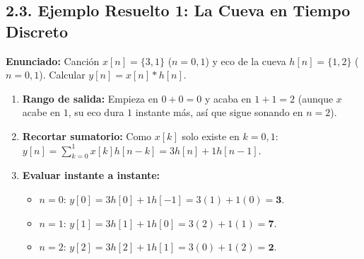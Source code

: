 \documentclass[10pt,a4paper]{article}
\begin{document}
	\subsection*{2.3. Ejemplo Resuelto 1: La Cueva en Tiempo Discreto}
	\textbf{Enunciado:} Canción $x[n] = \{3, 1\}$ ($n=0,1$) y eco de la cueva $h[n] = \{1, 2\}$ ($n=0,1$). Calcular $y[n] = x[n]*h[n]$.
	\begin{enumerate}
		\item \textbf{Rango de salida:} Empieza en $0+0 = 0$ y acaba en $1+1 = 2$ (aunque $x$ acabe en $1$, su eco dura $1$ instante más, así que sigue sonando en $n=2$).
		\item \textbf{Recortar sumatorio:} Como $x[k]$ solo existe en $k=0,1$: $y[n] = \sum_{k=0}^{1} x[k]h[n-k] = 3h[n] + 1h[n-1]$.
		\item \textbf{Evaluar instante a instante:}
		\begin{itemize}
			\item $n=0$: $y[0] = 3h[0] + 1h[-1] = 3(1) + 1(0) = \mathbf{3}$.
			\item $n=1$: $y[1] = 3h[1] + 1h[0] = 3(2) + 1(1) = \mathbf{7}$.
			\item $n=2$: $y[2] = 3h[2] + 1h[1] = 3(0) + 1(2) = \mathbf{2}$.
		\end{itemize}
	\end{enumerate}
\end{document}
